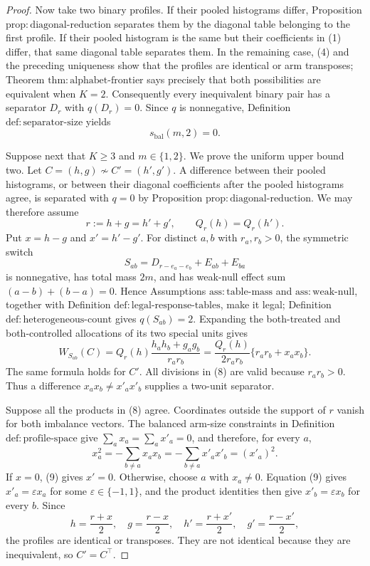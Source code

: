 \documentclass{article}
\begin{document}
\begin{proof}
Now take two binary profiles. If their pooled histograms differ, Proposition \(\mathrm{prop{:}diagonal\text{-}reduction}\) separates them by the diagonal table belonging to the first profile. If their pooled histogram is the same but their coefficients in (1) differ, that same diagonal table separates them. In the remaining case, (4) and the preceding uniqueness show that the profiles are identical or arm transposes; Theorem \(\mathrm{thm{:}alphabet\text{-}frontier}\) says precisely that both possibilities are equivalent when \(K=2\). Consequently every inequivalent binary pair has a separator \(D_r\) with \(q(D_r)=0\). Since \(q\) is nonnegative, Definition \(\mathrm{def{:}separator\text{-}size}\) yields
\[
s_{\mathrm{bal}}(m,2)=0. \tag{5}
\]

Suppose next that \(K\geq3\) and \(m\in\{1,2\}\). We prove the uniform upper bound two. Let \(C=(h,g)\not\sim C'=(h',g')\). A difference between their pooled histograms, or between their diagonal coefficients after the pooled histograms agree, is separated with \(q=0\) by Proposition \(\mathrm{prop{:}diagonal\text{-}reduction}\). We may therefore assume
\[
r:=h+g=h'+g',
\qquad
Q_r(h)=Q_r(h'). \tag{6}
\]
Put \(x=h-g\) and \(x'=h'-g'\). For distinct \(a,b\) with \(r_a,r_b>0\), the symmetric switch
\[
S_{ab}=D_{r-e_a-e_b}+E_{ab}+E_{ba} \tag{7}
\]
is nonnegative, has total mass \(2m\), and has weak-null effect sum \((a-b)+(b-a)=0\). Hence Assumptions \(\mathrm{ass{:}table\text{-}mass}\) and \(\mathrm{ass{:}weak\text{-}null}\), together with Definition \(\mathrm{def{:}legal\text{-}response\text{-}tables}\), make it legal; Definition \(\mathrm{def{:}heterogeneous\text{-}count}\) gives \(q(S_{ab})=2\). Expanding the both-treated and both-controlled allocations of its two special units gives
\[
W_{S_{ab}}(C)
=Q_r(h)\frac{h_ah_b+g_ag_b}{r_ar_b}
=\frac{Q_r(h)}{2r_ar_b}\{r_ar_b+x_ax_b\}. \tag{8}
\]
The same formula holds for \(C'\). All divisions in (8) are valid because \(r_ar_b>0\). Thus a difference \(x_ax_b\neq x'_ax'_b\) supplies a two-unit separator.

Suppose all the products in (8) agree. Coordinates outside the support of \(r\) vanish for both imbalance vectors. The balanced arm-size constraints in Definition \(\mathrm{def{:}profile\text{-}space}\) give \(\sum_a x_a=\sum_a x'_a=0\), and therefore, for every \(a\),
\[
x_a^2=-\sum_{b\neq a}x_ax_b
=-\sum_{b\neq a}x'_ax'_b=(x'_a)^2. \tag{9}
\]
If \(x=0\), (9) gives \(x'=0\). Otherwise, choose \(a\) with \(x_a\neq0\). Equation (9) gives \(x'_a=\varepsilon x_a\) for some \(\varepsilon\in\{-1,1\}\), and the product identities then give \(x'_b=\varepsilon x_b\) for every \(b\). Since
\[
h=\frac{r+x}{2},\quad g=\frac{r-x}{2},\quad
h'=\frac{r+x'}{2},\quad g'=\frac{r-x'}{2},
\]
the profiles are identical or transposes. They are not identical because they are inequivalent, so \(C'=C^\top\).


\end{proof}
\end{document}
